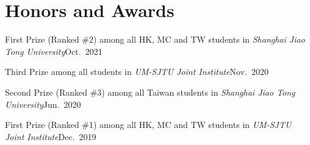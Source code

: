 \documentclass[letterpaper,10.8pt]{article}
\begin{document}
\section{Honors and Awards}
\begin{brief}
  \item {}
  {First Prize (Ranked \#2) among all HK, MC and TW students in \emph{Shanghai Jiao Tong University}}{Oct.\ 2021}

  \item {}
  {Third Prize among all students in \emph{UM-SJTU Joint Institute}}{Nov.\ 2020}

  \item {}
  {Second Prize (Ranked \#3) among all Taiwan students in \emph{Shanghai Jiao Tong University}}{Jun.\ 2020}

  \item {}
  {First Prize (Ranked \#1) among all HK, MC and TW students in \emph{UM-SJTU Joint Institute}}{Dec.\ 2019}
\end{brief}
\end{document}
